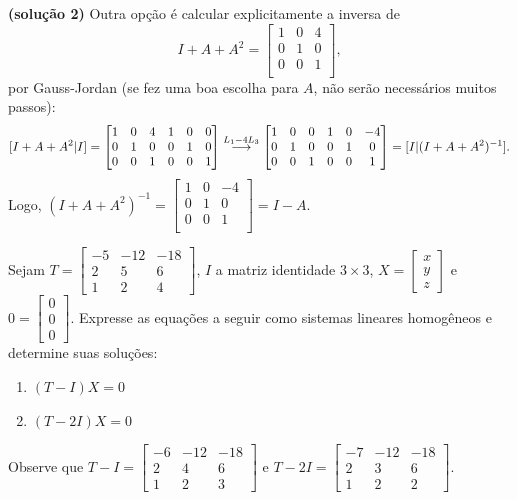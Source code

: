 \documentclass[12pt,a4paper]{article}
\newcommand{\grstep}[2][\relax]{%
   \ensuremath{\mathrel{
       {\mathop{\longrightarrow}\limits^{#2\mathstrut}_{
                                     \begin{subarray}{l} #1 \end{subarray}}}}}}
\begin{document}
\begin{ExerciseList}
\begin{enumerate}
\textbf{(solução 2)} Outra opção é calcular explicitamente a inversa de
\[
I + A + A^2 =
\begin{bmatrix}
1 &0 &4\\
0 &1 &0\\
0 &0 &1\\
\end{bmatrix},
\]
por Gauss-Jordan (se fez uma boa escolha para $A$, não serão necessários muitos passos):
\[
[ I + A + A^2 | I] =
\begin{bmatrix}
1 &0 &4& 1& 0& 0\\
0 &1 & 0& 0& 1& 0\\
0 &0 & 1& 0& 0& 1
\end{bmatrix}
\grstep{ L_1 - 4L_3 }
\begin{bmatrix}
1 &0 & 0& 1& 0& -4\\
0 &1 & 0& 0& 1& 0\\
0 &0 & 1& 0& 0& 1
\end{bmatrix}
=[I| (I + A + A^2)^{-1}].
\]
Logo, $(I + A + A^2)^{-1} = \begin{bmatrix}
1 &0 &-4\\
0 &1 &0\\
0 &0 &1\\
\end{bmatrix}
= I - A$.
\end{enumerate}


\Exercise[title={1,8}] Sejam $T = \begin{bmatrix}
-5&-12&-18\\
 2&  5&  6\\
 1&  2&  4
\end{bmatrix}$, $I$ a matriz identidade $3 \times 3$, $X = \begin{bmatrix}
x\\
y\\
z
\end{bmatrix}$ e $0 = \begin{bmatrix}
0\\
0\\
0
\end{bmatrix}$. Expresse as equações a seguir como sistemas lineares homogêneos e determine suas soluções:
\begin{multicols}{2}
\begin{enumerate}
\item $(T - I)X = 0$
\item $(T - 2I)X = 0$
\end{enumerate}
\end{multicols}
\Answer Observe que $T - I = \begin{bmatrix}
-6&-12&-18\\
 2&  4&  6\\
 1&  2&  3
\end{bmatrix}$ e $T - 2I = \begin{bmatrix}
-7&-12&-18\\
 2&  3&  6\\
 1&  2&  2
\end{bmatrix}$.


\end{ExerciseList}
\end{document}
